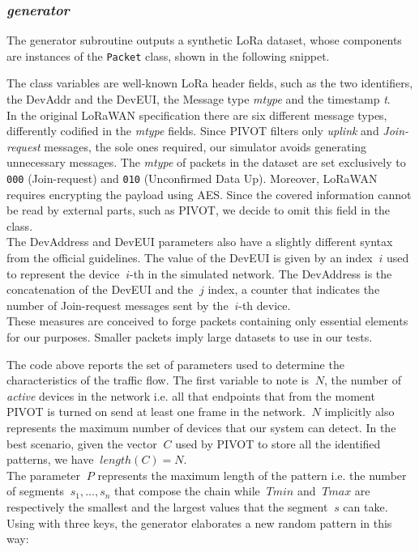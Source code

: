 \subsubsection{\textit{generator}}
The generator subroutine outputs a synthetic LoRa dataset, whose components are instances of the \texttt{Packet} class, shown in the following snippet.

\vspace{3mm}

\vspace{3mm}

The class variables are well-known LoRa header fields, such as the two identifiers, the DevAddr and the DevEUI, the Message type \textit{mtype} and the timestamp \textit{t}.
\\
In the original LoRaWAN specification there are six different message types, differently codified in the \textit{mtype} fields. Since PIVOT filters only \textit{uplink} and \textit{Join-request} messages, the sole ones required, our simulator avoids generating unnecessary messages. The \textit{mtype} of packets in the dataset are set exclusively to \texttt{000} (Join-request) and \texttt{010} (Unconfirmed Data Up). Moreover, LoRaWAN requires encrypting the payload using AES. Since the covered information cannot be read by external parts, such as PIVOT, we decide to omit this field in the class.
\\
The DevAddress and DevEUI parameters also have a slightly different syntax from the official guidelines. The value of the DevEUI is given by an index \(\ i \) used to represent the device \(\ i \)-th in the simulated network. The DevAddress is the concatenation of the DevEUI and the \(\ j \) index, a counter that indicates the number of Join-request messages sent by the \(\ i \)-th device.
\\
These measures are conceived to forge packets containing only essential elements for our purposes. Smaller packets imply large datasets to use in our tests.

\vspace{3mm}

\vspace{3mm}

The code above reports the set of parameters used to determine the characteristics of the traffic flow. The first variable to note is \(\ N \), the number of \textit{active} devices in the network i.e. all that endpoints that from the moment PIVOT is turned on send at least one frame in the network. \(\ N \) implicitly also represents the maximum number of devices that our system can detect. In the best scenario, given the vector \(\ C \) used by PIVOT to store all the identified patterns, we have \(\ length(C) = N \).
\\
The parameter \(\ P \) represents the maximum length of the pattern i.e. the number of segments \(\ s_{1}, ..., s_{n} \) that compose the chain while \(\ Tmin \) and \(\ Tmax \) are respectively the smallest and the largest values that the segment \(\ s \) can take.
\\
Using with three keys, the generator elaborates a new random pattern in this way:

